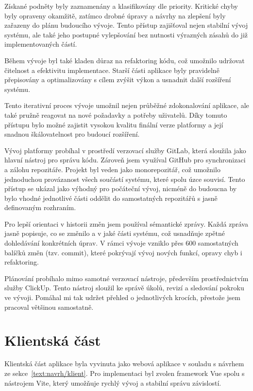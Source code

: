 Získané podněty byly zaznamenány a klasifikovány dle priority. 
Kritické chyby byly opraveny okamžitě, zatímco drobné úpravy a návrhy na zlepšení byly zařazeny do plánu budoucího vývoje. 
Tento přístup zajišťoval nejen stabilní vývoj systému, ale také jeho postupné vylepšování bez nutnosti výrazných zásahů do již implementovaných částí.

Během vývoje byl také kladen důraz na refaktoring kódu, což umožnilo udržovat čitelnost a efektivitu implementace. 
Starší části aplikace byly pravidelně přepisovány a optimalizovány s cílem zvýšit výkon a usnadnit další rozšíření systému.

Tento iterativní proces vývoje umožnil nejen průběžné zdokonalování aplikace, ale také pružně reagovat na nové požadavky a potřeby uživatelů. 
Díky tomuto přístupu bylo možné zajistit vysokou kvalitu finální verze platformy a její snadnou škálovatelnost pro budoucí rozšíření.

Vývoj platformy probíhal v prostředí verzovací služby GitLab, která sloužila jako hlavní nástroj pro správu kódu. 
Zároveň jsem využíval GitHub pro synchronizaci a zálohu repozitáře. 
Projekt byl veden jako monorepozitář, což umožnilo jednoduchou provázanost všech součástí systému, které spolu úzce souvisí. 
Tento přístup se ukázal jako výhodný pro počáteční vývoj, nicméně do budoucna by bylo vhodné jednotlivé části oddělit do samostatných repozitářů s jasně definovaným rozhraním.

Pro lepší orientaci v historii změn jsem používal sémantické zprávy. 
Každá zpráva jasně popisuje, co se změnilo a v jaké části systému, což usnadňuje zpětné dohledávání konkrétních úprav. 
V rámci vývoje vzniklo přes 600 samostatných balíčků změn (tzv. commit), které pokrývají vývoj nových funkcí, opravy chyb i refaktoring.

Plánování probíhalo mimo samotné verzovací nástroje, především prostřednictvím služby ClickUp. 
Tento nástroj sloužil ke správě úkolů, revizí a sledování pokroku ve vývoji. 
Pomáhal mi tak udržet přehled o jednotlivých krocích, přestože jsem pracoval většinou samostatně.


\section{Klientská část}\label{text:realizace/klient}

Klientská část aplikace byla vyvinuta jako webová aplikace v souladu s návrhem ze sekce~\ref{text:navrh/klient}. 
Pro implementaci byl zvolen framework Vue spolu s nástrojem Vite, který umožňuje rychlý vývoj a stabilní správu závislostí.

